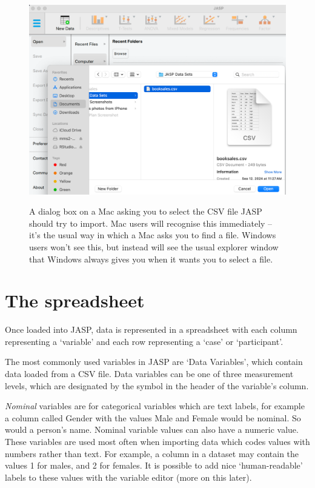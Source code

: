 \begin{figure}[t]
\begin{center}
\includegraphics[width=14cm]{../img/introj/openscreen.pdf}
\caption{A dialog box on a Mac asking you to select the CSV file JASP should try to import. Mac users will recognise this immediately -- it's the usual way in which a Mac asks you to find a file. Windows users won't see this, but instead will see the usual explorer window that Windows always gives you when it wants you to select a file.}
\HR
\label{fig:fileopen}
\end{center}
\end{figure} 

\section{The spreadsheet\label{sec:spreadsheet}}

Once loaded into JASP, data is represented in a spreadsheet with each column representing a ‘variable’ and each row representing a ‘case’ or ‘participant’.


The most commonly used variables in JASP are ‘Data Variables’, which contain data loaded from a CSV file. Data variables can be one of three measurement levels, which are designated by the symbol in the header of the variable’s column.

{\it Nominal} variables are for categorical variables which are text labels, for example a column called Gender with the values Male and Female would be nominal. So would a person’s name. Nominal variable values can also have a numeric value. These variables are used most often when importing data which codes values with numbers rather than text. For example, a column in a dataset may contain the values 1 for males, and 2 for females. It is possible to add nice ‘human-readable’ labels to these values with the variable editor (more on this later).

